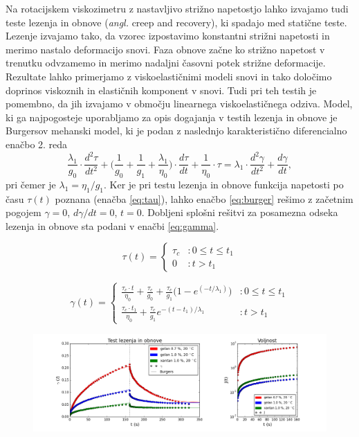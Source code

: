\documentclass{article}
\begin{document}
Na rotacijskem viskozimetru z nastavljivo strižno napetostjo lahko izvajamo tudi teste lezenja in obnove (\textit{angl.} creep and recovery), ki spadajo med statične teste. Lezenje izvajamo tako, da vzorec izpostavimo konstantni strižni napetosti in merimo nastalo deformacijo snovi. Faza obnove začne ko strižno napetost v trenutku odvzamemo in merimo nadaljni časovni potek strižne deformacije. Rezultate lahko primerjamo z viskoelastičnimi modeli snovi in tako določimo doprinos viskoznih in elastičnih komponent v snovi. Tudi pri teh testih je pomembno, da jih izvajamo v območju linearnega viskoelastičnega odziva.
Model, ki ga najpogosteje uporabljamo za opis dogajanja v testih lezenja in obnove je Burgersov mehanski model, ki je podan z naslednjo karakteristično diferencialno enačbo 2. reda
\begin{equation} \label{eq:burger}
\frac{\lambda_1}{g_0}\cdot\frac{d^2 \tau}{dt^2} + \bigg(\frac{1}{g_0} + \frac{1}{g_1} + \frac{\lambda_1}{\eta_0}\bigg)\cdot\frac{d\tau}{dt} + \frac{1}{\eta_0}\cdot\tau =
\lambda_1 \cdot \frac{d^2\gamma}{dt^2} + \frac{d\gamma}{dt},
\end{equation}
pri čemer je $\lambda_1 = \eta_1 / g_1$. Ker je pri testu lezenja in obnove funkcija napetosti po času $\tau(t)$ poznana (enačba \ref{eq:tau}), lahko enačbo \ref{eq:burger} rešimo z začetnim pogojem $\gamma = 0$, $d\gamma/dt = 0$, $t = 0$. Dobljeni splošni rešitvi za posamezna odseka lezenja in obnove sta podani v enačbi \ref{eq:gamma}.

\begin{equation} \label{eq:tau}
\tau(t) = \begin{cases}
      \tau_c & : 0 \leq t \leq t_1 \\
      0 & : t > t_1 
\end{cases}
\end{equation}

\begin{equation} \label{eq:gamma}
\gamma(t) = \begin{cases}
      \frac{\tau_c \cdot t}{\eta_0} + \frac{\tau_c}{g_0} + \frac{\tau_c}{g_1}\big(1 - e^{(-t/\lambda_1)} \big) & : 0 \leq t \leq t_1 \\
      \frac{\tau_c \cdot t_1}{\eta_0} + \frac{\tau_c}{g_1}e^{-(t-t_1)/\lambda_1} & : t > t_1 
\end{cases}
\end{equation}

\begin{figure}
  \centering
  \includegraphics[width=\linewidth]{S1creep.png}
  \caption{}
  \label{fig:creep1}
\end{figure}
\end{document}
